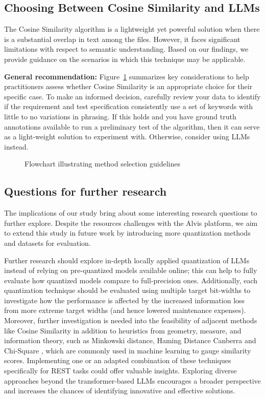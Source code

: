 \documentclass[conference]{IEEEtran}
\begin{document}
\subsection{Choosing Between Cosine Similarity and LLMs}

The Cosine Similarity algorithm is a lightweight yet powerful solution when there is a substantial overlap in text among the files. However, it faces significant limitations with respect to semantic understanding. Based on our findings, we provide guidance on the scenarios in which this technique may be applicable.

\textbf{General recommendation:} Figure~\ref{fig:flowchart}  summarizes key considerations to help practitioners assess whether Cosine Similarity is an appropriate choice for their specific case. To make an informed decision, carefully review your data to identify if the requirement and test specification consistently use a set of keywords with little to no variations in phrasing. If this holds and you have ground truth annotations available to run a preliminary test of the algorithm, then it can serve as a light-weight solution to experiment with. Otherwise, consider using LLMs instead.

\begin{figure}[h]
    \centering
    
    \caption{Flowchart illustrating method selection guidelines}
    \label{fig:flowchart}
\end{figure}

\subsection{Questions for further research}

The implications of our study bring about some interesting research questions to further explore. Despite the resources challenges with the Alvis platform, we aim to extend this study in future work by introducing more quantization methods and datasets for evaluation. 

Further research should explore in-depth locally applied quantization of LLMs instead of relying on pre-quantized models available online; this can help to fully evaluate how quantized models compare to full-precision ones. Additionally, each quantization technique should be evaluated using multiple target bit-widths to investigate how the performance is affected by the increased information loss from more extreme target widths (and hence lowered maintenance expenses). Moreover, further investigation is needed into the feasibility of adjacent methods like Cosine Similarity in addition to heuristics from geometry, measure, and information theory, such as Minkowski distance, Haming Distance \cite{bookstein2002hammingdistance} Canberra and Chi-Square \cite{chi2005chisquare}, which are commonly used in machine learning to gauge similarity scores. Implementing one or an adapted combination of these techniques specifically for REST tasks could offer valuable insights. Exploring diverse approaches beyond the transformer-based LLMs encourages a broader perspective and increases the chances of identifying innovative and effective solutions.
\end{document}
